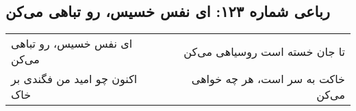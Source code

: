 \begin{center}
\section*{رباعی شماره ۱۲۳: ای نفس خسیس، رو تباهی می‌کن}
\label{sec:123}
\begin{longtable}{l p{0.5cm} r}
ای نفس خسیس، رو تباهی می‌کن
&&
تا جان خسته است روسیاهی می‌کن
\\
اکنون چو امید من فگندی بر خاک
&&
خاکت به سر است، هر چه خواهی می‌کن
\\
\end{longtable}
\end{center}

